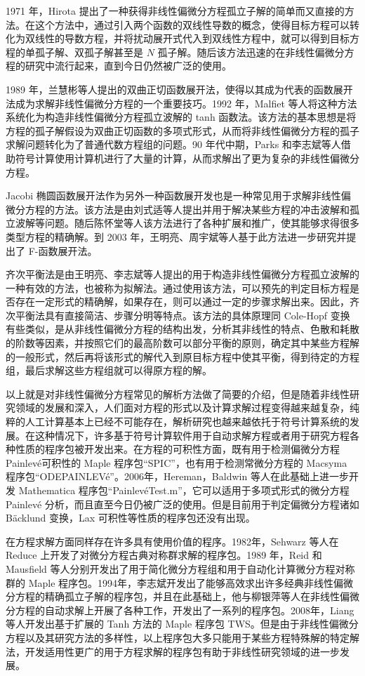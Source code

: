 1971 年，Hirota 提出了一种获得非线性偏微分方程孤立子解的简单而又直接的方法。在这个方法中，通过引入两个函数的双线性导数的概念，使得目标方程可以转化为双线性的导数方程，并将扰动展开式代入到双线性方程中，就可以得到目标方程的单孤子解、双孤子解甚至是 $N$ 孤子解。随后该方法迅速的在非线性偏微分方程的研究中流行起来，直到今日仍然被广泛的使用。

1989 年，兰慧彬等人提出的双曲正切函数展开法，使得以其成为代表的函数展开法成为求解非线性偏微分方程的一个重要技巧。1992 年，Malfiet 等人将这种方法系统化为构造非线性偏微分方程孤立波解的 tanh 函数法。该方法的基本思想是将方程的孤子解假设为双曲正切函数的多项式形式，从而将非线性偏微分方程的孤子求解问题转化为了普通代数方程组的问题。90 年代中期，Parks 和李志斌等人借助符号计算使用计算机进行了大量的计算，从而求解出了更为复杂的非线性偏微分方程。

Jacobi 椭圆函数展开法作为另外一种函数展开发也是一种常见用于求解非线性偏微分方程的方法。该方法是由刘式适等人提出并用于解决某些方程的冲击波解和孤立波解等问题。随后陈怀堂等人该方法进行了各种扩展和推广，使其能够求得很多类型方程的精确解。到 2003 年，王明亮、周宇斌等人基于此方法进一步研究并提出了 F-函数展开法。

齐次平衡法是由王明亮、李志斌等人提出的用于构造非线性偏微分方程孤立波解的一种有效的方法，也被称为拟解法。通过使用该方法，可以预先的判定目标方程是否存在一定形式的精确解，如果存在，则可以通过一定的步骤求解出来。因此，齐次平衡法具有直接简洁、步骤分明等特点。该方法的具体原理同 Cole-Hopf 变换有些类似，是从非线性偏微分方程的结构出发，分析其非线性的特点、色散和耗散的阶数等因素，并按照它们的最高阶数可以部分平衡的原则，确定其中某些方程解的一般形式，然后再将该形式的解代入到原目标方程中使其平衡，得到待定的方程组，最后求解这些方程组就可以得原方程的解。

以上就是对非线性偏微分方程常见的解析方法做了简要的介绍，但是随着非线性研究领域的发展和深入，人们面对方程的形式以及计算求解过程变得越来越复杂，纯粹的人工计算基本上已经不可能存在，解析研究也越来越依托于符号计算系统的发展。在这种情况下，许多基于符号计算软件用于自动求解方程或者用于研究方程各种性质的程序包被开发出来。在方程的可积性方面，既有用于检测偏微分方程 Painlev\'{e}可积性的 Maple 程序包“SPIC”，也有用于检测常微分方程的  Macsyma 程序包“ODEPAINLEV\'{e}”。2006年，Hereman，Baldwin 等人在此基础上进一步开发  Mathematica 程序包“Painlev\'{e}Test.m”，它可以适用于多项式形式的微分方程 Painlev\'{e} 分析，而且直至今日仍被广泛的使用。但是目前用于判定偏微分方程诸如 B\"{a}cklund 变换，Lax 可积性等性质的程序包还没有出现。

在方程求解方面同样存在许多具有使用价值的程序。1982年，Sehwarz 等人在 Reduce 上开发了对微分方程古典对称群求解的程序包。1989 年，Reid 和 Mausfield 等人分别开发出了用于简化微分方程组和用于自动化计算微分方程对称群的  Maple 程序包。1994年，李志斌开发出了能够高效求出许多经典非线性偏微分方程的精确孤立子解的程序包，并且在此基础上，他与柳银萍等人在非线性偏微分方程的自动求解上开展了各种工作，开发出了一系列的程序包。2008年，Liang 等人开发出基于扩展的 Tanh 方法的 Maple 程序包 TWS。但是由于非线性偏微分方程以及其研究方法的多样性，以上程序包大多只能用于某些方程特殊解的特定解法，开发适用性更广的用于方程求解的程序包有助于非线性研究领域的进一步发展。

